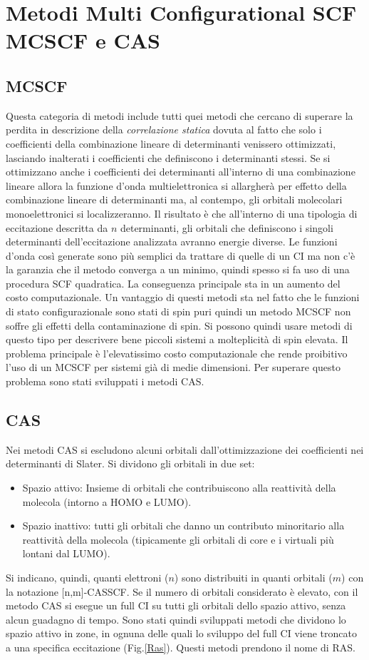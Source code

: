 \documentclass[oneside]{amsbook}
\numberwithin{section}{chapter}
\numberwithin{equation}{section}
\numberwithin{figure}{section}
\begin{document}
\section{Metodi Multi Configurational SCF MCSCF e CAS}
\subsection{MCSCF}
Questa categoria di metodi include tutti quei metodi che cercano di superare la perdita in descrizione della \emph{correlazione statica} dovuta al fatto che solo i coefficienti della combinazione lineare di determinanti venissero ottimizzati, lasciando inalterati i coefficienti che definiscono i determinanti stessi. Se si ottimizzano anche i coefficienti dei determinanti all'interno di una combinazione lineare allora la funzione d'onda multielettronica si allargherà per effetto della combinazione lineare di determinanti ma, al contempo, gli orbitali molecolari monoelettronici si localizzeranno. Il risultato è che all'interno di una tipologia di eccitazione descritta da $n$ determinanti, gli orbitali che definiscono i singoli determinanti dell'eccitazione analizzata avranno energie diverse.
Le funzioni d'onda così generate sono più semplici da trattare di quelle di un CI ma non c'è la garanzia che il metodo converga a un minimo, quindi spesso si fa uso di una procedura SCF quadratica. La conseguenza principale sta in un aumento del costo computazionale. Un vantaggio di questi metodi sta nel fatto che le funzioni di stato configurazionale sono stati di spin puri quindi un metodo MCSCF non soffre gli effetti della contaminazione di spin.
Si possono quindi usare metodi di questo tipo per descrivere bene piccoli sistemi a molteplicità di spin elevata.
Il problema principale è l'elevatissimo costo computazionale che rende proibitivo l'uso di un MCSCF per sistemi già di medie dimensioni. Per superare questo problema sono stati sviluppati i metodi CAS.
\subsection{CAS}
Nei metodi CAS si escludono alcuni orbitali dall'ottimizzazione dei coefficienti nei determinanti di Slater. Si dividono gli orbitali in due set:
\begin{itemize}
\item Spazio attivo: Insieme di orbitali che contribuiscono alla reattività della molecola (intorno a HOMO e LUMO).
\item Spazio inattivo: tutti gli orbitali che danno un contributo minoritario alla reattività della molecola (tipicamente gli orbitali di core e i virtuali più lontani dal LUMO).
\end{itemize}
Si indicano, quindi, quanti elettroni ($n$) sono distribuiti in quanti orbitali ($m$) con la notazione [n,m]-CASSCF.
Se il numero di orbitali considerato è elevato, con il metodo CAS si esegue un full CI su tutti gli orbitali dello spazio attivo, senza alcun guadagno di tempo. Sono stati quindi sviluppati metodi che dividono lo spazio attivo in zone, in ognuna delle quali lo sviluppo del full CI viene troncato a una specifica eccitazione (Fig.\ref{Ras}). Questi metodi prendono il nome di RAS.
\end{document}
